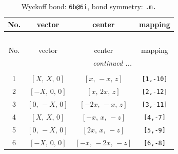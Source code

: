 \documentclass[fleqn,8pt]{jsarticle}
\begin{document}
\begin{longtable}{cccc}
\caption{Wyckoff bond: {\tt 6b@6i}, bond symmetry: {\tt .m.}}
 \\
 \hline \hline
No. & vector & center & mapping \\ \hline \endfirsthead

\multicolumn{3}{l}{\tablename\ \thetable{}} \\
 \hline \hline
No. & vector & center & mapping \\ \hline \endhead

 \hline \hline
\multicolumn{3}{r}{\footnotesize\it continued ...} \\ \endfoot

 \hline \hline
\multicolumn{3}{r}{} \\ \endlastfoot

1 & $\left[ X,\, X,\, 0 \right]$ & $\left[ x,\, - x,\, z \right]$ & {\tt [1,-10]} \\ \hline
2 & $\left[ - X,\, 0,\, 0 \right]$ & $\left[ x,\, 2 x,\, z \right]$ & {\tt [2,-12]} \\ \hline
3 & $\left[ 0,\, - X,\, 0 \right]$ & $\left[ - 2 x,\, - x,\, z \right]$ & {\tt [3,-11]} \\ \hline
4 & $\left[ X,\, X,\, 0 \right]$ & $\left[ - x,\, x,\, - z \right]$ & {\tt [4,-7]} \\ \hline
5 & $\left[ 0,\, - X,\, 0 \right]$ & $\left[ 2 x,\, x,\, - z \right]$ & {\tt [5,-9]} \\ \hline
6 & $\left[ - X,\, 0,\, 0 \right]$ & $\left[ - x,\, - 2 x,\, - z \right]$ & {\tt [6,-8]} \\
\end{longtable}
\renewcommand{\arraystretch}{1.2}
\end{document}
